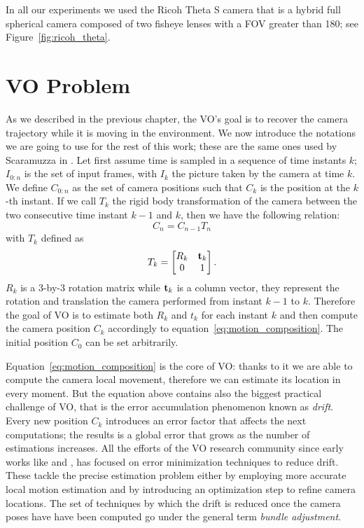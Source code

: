 In all our experiments we used the Ricoh Theta S camera that is a hybrid full spherical camera 
composed of two fisheye lenses with a FOV greater than 180\degree; see Figure~\ref{fig:ricoh_theta}.
%
%

\section{VO Problem}
\label{sec:vo_problem}
As we described in the previous chapter, the VO's goal is to recover the 
camera trajectory while it is moving in the environment. We now
introduce the notations we are going to use for the rest of this work; 
these are the same ones used by Scaramuzza in \cite{scaramuzzaVisualOdometryI}.
Let first assume time is sampled in a sequence of time instants \(k\); 
\(I_{0:n} \) is the set of input frames, with \(I_{k}\) the picture taken by 
the camera at time
\(k\). We define \(C_{0:n}\) as the set of camera 
positions such that \(C_k\) is the position at the \(k\)-th instant.
If we call \(T_k\) the rigid body transformation of the camera between the two
consecutive time instant $k-1$ and $k$, then we have the following relation:
\begin{equation}
	\label{eq:motion_composition}
C_n = C_{n-1} T_n
\end{equation}
\noindent with \(T_k\) defined as
\begin{equation*}
	T_k =
	\begin{bmatrix}
	R_k & \mathbf{t}_k \\
	0 & 1
	\end{bmatrix} \text{.}
\end{equation*}
\noindent $R_k$ is a 3-by-3 rotation matrix while $\mathbf{t}_k$ is a column vector, 
they represent the rotation and translation the camera performed from instant 
$k-1$ to $k$.
Therefore the goal of VO is to estimate both $R_k$ and $t_k$ for each instant 
$k$ and then compute the camera position $C_k$ accordingly to 
equation~\ref{eq:motion_composition}.
The initial position $C_0$ can be set arbitrarily.

Equation~\ref{eq:motion_composition} is the core of VO: thanks to it we are able
to compute the camera local movement, therefore we can estimate its location in 
every moment. But the equation above contains also the biggest practical 
challenge of VO, that is the error accumulation phenomenon known as 
\textit{drift}.
Every new position $C_k$ introduces an error factor that affects the next 
computations; the results is a global error that grows as the number of 
estimations increases.
All the efforts of the VO research community since early works like 
\cite{harris19883d} and \cite{moravec1980obstacle}, has focused on error
minimization techniques to reduce drift.
These tackle the precise estimation problem either by employing more accurate
local motion estimation and by introducing an optimization step to refine 
camera locations.
The set of techniques by which the drift is reduced once the camera poses have 
have been computed go under the general term \textit{bundle adjustment}.

